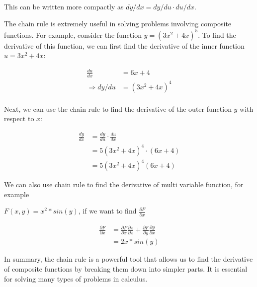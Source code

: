 This can be written more compactly as $dy/dx = dy/du \cdot du/dx$.

The chain rule is extremely useful in solving problems involving composite 
functions. For example, consider the function $y = (3x^2 + 4x)^5$. To find the 
derivative of this function, we can first find the derivative of the inner 
function $u = 3x^2 + 4x$:

\begin{align*}
\frac{du}{dx} &= 6x + 4 \\
\Rightarrow dy/du &= (3x^2 + 4x)^4 \\
\end{align*}

Next, we can use the chain rule to find the derivative of the outer function 
$y$ with respect to $x$:

\begin{align*}
  \frac{dy}{dx} &= \frac{dy}{du} \cdot \frac{du}{dx} \\
  &= 5(3x^2 + 4x)^4 \cdot (6x + 4) \\
  &= 5(3x^2 + 4x)^4(6x + 4)
  \end{align*}
  
  We can also use chain rule to find the derivative of multi variable function, 
  for example 
  
  $F(x,y) = x^2*sin(y)$, if we want to find $\frac{\partial F}{\partial x}$
  
  \begin{align*}
  \frac{\partial F}{\partial x} &= \frac{\partial F}{\partial x}\frac{
    \partial x}{\partial x} + \frac{\partial F}{\partial y}\frac{\partial y}
    {\partial x}\\
  &= 2x*sin(y)
  \end{align*}
  
  In summary, the chain rule is a powerful tool that allows us to find the 
  derivative of composite functions by breaking them down into simpler parts. 
  It is essential for solving many types of problems in calculus.


